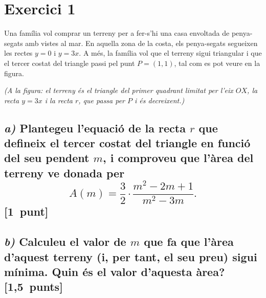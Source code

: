 \documentclass[11pt,a4paper]{article}
\begin{document}
\section*{\textcolor{blauPista}{Exercici 1}}

\noindent Una família vol comprar un terreny per a fer-s'hi una casa envoltada de penya-segats amb vistes al mar. En aquella zona de la costa, els penya-segats segueixen les rectes $y = 0$ i $y = 3x$. A més, la família vol que el terreny sigui triangular i que el tercer costat del triangle passi pel punt $P = (1, 1)$, tal com es pot veure en la figura.

\noindent\textit{(A la figura: el terreny és el triangle del primer quadrant limitat per l'eix $OX$, la recta $y = 3x$ i la recta $r$, que passa per $P$ i és decreixent.)}

\subsection*{\textit{a)} \normalfont Plantegeu l'equació de la recta $r$ que defineix el tercer costat del triangle en funció del seu pendent $m$, i comproveu que l'àrea del terreny ve donada per
\[
A(m) = \dfrac{3}{2} \cdot \dfrac{m^{2} - 2m + 1}{m^{2} - 3m}.
\]
\hspace*{\fill}\textnormal{[1~punt]}}


\subsection*{\textit{b)} \normalfont Calculeu el valor de $m$ que fa que l'àrea d'aquest terreny (i, per tant, el seu preu) sigui mínima. Quin és el valor d'aquesta àrea? \hspace*{\fill}\textnormal{[1,5~punts]}}
\end{document}
